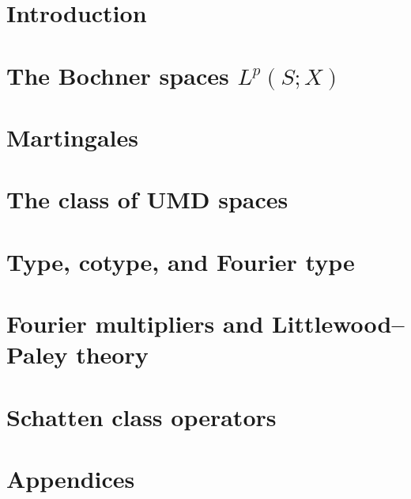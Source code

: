\documentclass[a4paper,10pt,intlimits,sumlimits]{amsart}
\begin{document}


\maketitle
\footnotesize
\tableofcontents
\normalsize

\section{Introduction}
\label{sec:intro}


\section{The Bochner spaces \texorpdfstring{$L^p(S;X)$}{Lp(S;X)}}
\label{sec:Bochner-spaces}


\section{Martingales}
\label{sec:martingales} 


\section{The class of UMD spaces}
\label{sec:UMD}


\section{Type, cotype, and Fourier type}
\label{sec:type}


\section{Fourier multipliers and Littlewood--Paley theory}
\label{sec:HT}


\section{Schatten class operators}
\label{sec:schatten}


\section{Appendices}
\label{sec:appendices}





\printbibliography

% 
%  
\end{document}
